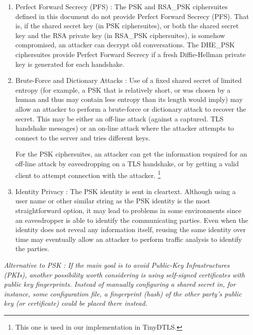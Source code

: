 \begin{enumerate}
    \item Perfect Forward Secrecy (PFS) : The PSK and RSA\_PSK ciphersuites defined in this document do not provide Perfect Forward Secrecy (PFS).  That is, if the shared secret key (in PSK ciphersuites), or both the shared secret key and the RSA private key (in RSA\_PSK ciphersuites), is somehow compromised, an attacker can decrypt old conversations. The DHE\_PSK ciphersuites provide Perfect Forward Secrecy if a fresh Diffie-Hellman private key is generated for each handshake.

    \item Brute-Force and Dictionary Attacks : Use of a fixed shared secret of limited entropy (for example, a PSK that is relatively short, or was chosen by a human and thus may contain less entropy than its length would imply) may allow an attacker to perform a brute-force or dictionary attack to recover the secret.  This may be either an off-line attack (against a captured. TLS handshake messages) or an on-line attack where the attacker attempts to connect to the server and tries different keys.

    For the PSK ciphersuites, an attacker can get the information required for an off-line attack by eavesdropping on a TLS handshake, or by getting a valid client to attempt connection with the attacker. \footnote{This one is used in our implementation in TinyDTLS.}
    
    \item Identity Privacy : The PSK identity is sent in cleartext.  Although using a user name or other similar string as the PSK identity is the most straightforward option, it may lead to problems in some environments since an eavesdropper is able to identify the communicating parties.  Even when the identity does not reveal any information itself, reusing the same identity over time may eventually allow an attacker to perform traffic analysis to identify the parties.  

\end{enumerate}

\textit{Alternative to PSK : If the main goal is to avoid Public-Key Infrastructures (PKIs), another possibility worth considering is using self-signed certificates with public key fingerprints.  Instead of manually configuring a shared secret in, for instance, some configuration file, a fingerprint (hash) of the other party's public key (or certificate) could be placed there instead.}


